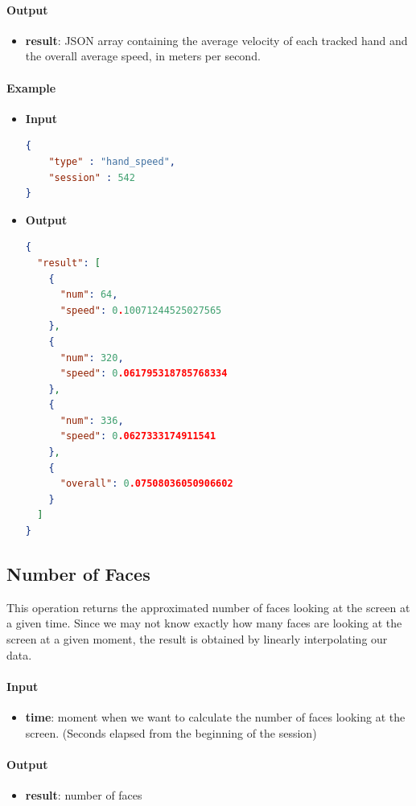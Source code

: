 \documentclass[a4paper,notitlepage,onecolumn]{hitec}  %
\begin{document}
\paragraph{Output}
\begin{itemize}
\item\textbf{result}: JSON array containing the average velocity of each tracked hand and the overall average speed, in meters per second.
\end{itemize}

\paragraph{Example}
\begin{itemize}
\item\textbf{Input}
\begin{lstlisting}[language=json,firstnumber=1]
{
    "type" : "hand_speed",
    "session" : 542
}
\end{lstlisting}
\item\textbf{Output}
\begin{lstlisting}[language=json,firstnumber=1]
{
  "result": [
    {
      "num": 64,
      "speed": 0.10071244525027565
    },
    {
      "num": 320,
      "speed": 0.061795318785768334
    },
    {
      "num": 336,
      "speed": 0.0627333174911541
    },
    {
      "overall": 0.07508036050906602
    }
  ]
}
\end{lstlisting}
\end{itemize}

\subsection{Number of Faces}
This operation returns the approximated number of faces looking at the screen at a given time. Since we may not know exactly how many faces are looking at the screen at a given moment, the result is obtained by linearly interpolating our data.

\paragraph{Input}
\begin{itemize}
\item\textbf{time}: moment when we want to calculate the number of faces looking at the screen. (Seconds elapsed from the beginning of the session)
\end{itemize}

\paragraph{Output}
\begin{itemize}
\item\textbf{result}: number of faces
\end{itemize}
\end{document}
